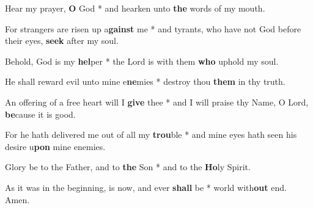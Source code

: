 \begin{multicols}{2}
	Hear my prayer, \textbf{O} God * and hearken unto \textbf{the} words of my mouth.
	
	For strangers are risen up a\textbf{gainst} me * and tyrants, who have not God before their eyes, \textbf{seek} after my soul.
	
	Behold, God is my \textbf{hel}per * the Lord is with them \textbf{who} uphold my soul.
	
	He shall reward evil unto mine e\textbf{ne}mies * destroy thou \textbf{them} in thy truth.
	
	An offering of a free heart will I \textbf{give} thee * and I will praise thy Name, O Lord, \textbf{be}cause it is good.
	
	For he hath delivered me out of all my \textbf{trou}ble * and mine eyes hath seen his desire u\textbf{pon} mine enemies.
	
	Glory be to the Father, and to \textbf{the} Son * and to the \textbf{Ho}ly Spirit.
	
	As it was in the beginning, is now, and ever \textbf{shall} be * world with\textbf{out} end. Amen.
\end{multicols}